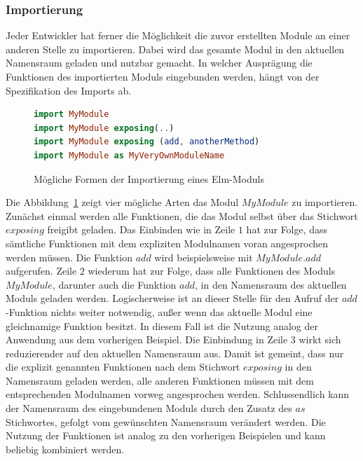 \subsubsection{Importierung}
\label{sec:Importierung}
Jeder Entwickler hat ferner die Möglichkeit die zuvor erstellten Module an einer anderen Stelle zu importieren. Dabei wird das gesamte Modul in den aktuellen Namensraum geladen und nutzbar gemacht. In welcher Ausprägung die Funktionen des importierten Moduls eingebunden werden, hängt von der Spezifikation des Imports ab.
\begin{figure}[h]
\begin{lstlisting}[language=Elm]
import MyModule
import MyModule exposing(..)
import MyModule exposing (add, anotherMethod)
import MyModule as MyVeryOwnModuleName
\end{lstlisting}
\caption{Mögliche Formen der Importierung eines Elm-Moduls}\label{fig:elm-import-module}
\end{figure}
Die Abbildung~\ref{fig:elm-import-module} zeigt vier mögliche Arten das Modul $MyModule$ zu importieren. Zunächst einmal werden alle Funktionen, die das Modul selbst über das Stichwort $exposing$ freigibt geladen. Das Einbinden wie in Zeile $1$ hat zur Folge, dass sämtliche Funktionen mit dem expliziten Modulnamen voran angesprochen werden müssen. Die Funktion $add$ wird beispielsweise mit $MyModule.add$ aufgerufen. Zeile $2$ wiederum hat zur Folge, dass alle Funktionen des Moduls $MyModule$, darunter auch die Funktion $add$, in den Namensraum des aktuellen Moduls geladen werden. Logischerweise ist an dieser Stelle für den Aufruf der $add$-Funktion nichts weiter notwendig, außer wenn das aktuelle Modul eine gleichnamige Funktion besitzt. In diesem Fall ist die Nutzung analog der Anwendung aus dem vorherigen Beispiel. Die Einbindung in Zeile $3$ wirkt sich reduzierender auf den aktuellen Namensraum aus. Damit ist gemeint, dass nur die explizit genannten Funktionen nach dem Stichwort $exposing$ in den Namensraum geladen werden, alle anderen Funktionen müssen mit dem entsprechenden Modulnamen vorweg angesprochen werden. Schlussendlich kann der Namensraum des eingebundenen Moduls durch den Zusatz des $as$ Stichwortes, gefolgt vom gewünschten Namensraum verändert werden. Die Nutzung der Funktionen ist analog zu den vorherigen Beispielen und kann beliebig kombiniert werden.


